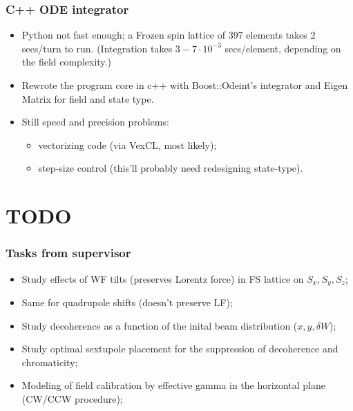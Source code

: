 \documentclass[pdf]{beamer}
\begin{document}
\begin{frame}
\begin{columns}
\begin{minipage}{.3\textheight}
			\end{minipage}
		\end{columns}
	\end{frame}

	\begin{frame}
		\frametitle{C++ ODE integrator}
		\begin{itemize}
			\item Python not fast enough; a Frozen spin lattice of 397 elements takes 2 secs/turn to run. (Integration takes $3-7\cdot 10^{-3}$ secs/element, depending on the field complexity.)
			\item Rewrote the program core in c++ with Boost::Odeint's integrator and Eigen Matrix for field and state type.
			\item Still speed and precision problems:
			\begin{itemize}
				\item vectorizing code (via VexCL, most likely);
				\item step-size control (this'll probably need redesigning state-type).
			\end{itemize}
		\end{itemize}
	\end{frame}

\section{TODO}
	\begin{frame}
		\frametitle{Tasks from supervisor}
		\begin{itemize}
			\item Study effects of WF tilts (preserves Lorentz force) in FS lattice on $S_x, S_y, S_z$;
			\item Same for quadrupole shifts (doesn't preserve LF);
			\item Study decoherence as a function of the inital beam distribution ($x, y, \delta W$);
			\item Study optimal sextupole placement for the suppression of decoherence and chromaticity;
			\item Modeling of field calibration by effective gamma in the horizontal plane (CW/CCW procedure);
		\end{itemize}
	\end{frame}
\end{document}
